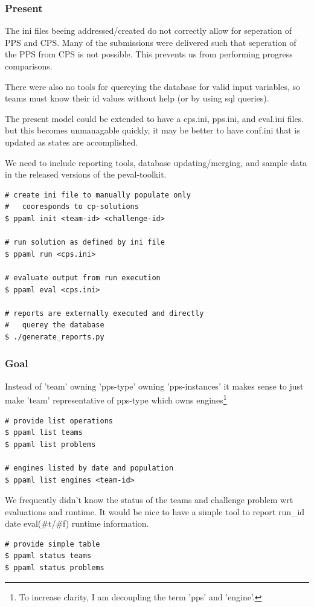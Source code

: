 \documentclass[11pt]{article} %
\def\ptk{peval-toolkit\xspace}
\begin{document}
  \begin{multicols}{2}
  \subsubsection*{Present}
  The ini files beeing addressed/created do not correctly allow for seperation of PPS and CPS. Many of the submissions were delivered such that seperation of the PPS from CPS is not possible. This prevents us from performing progress comparisons. 

  There were also no tools for quereying the database for valid input variables, so teams must know their id values without help (or by using sql queries).

  
  The present model could be extended to have a cps.ini, pps.ini, and eval.ini files. but this becomes unmanagable quickly, it may be better to have conf.ini that is updated as states are accomplished.  

  We need to include reporting tools, database updating/merging, and sample data in the released versions of the \ptk.
  
  \begin{lstlisting}
# create ini file to manually populate only
#   cooresponds to cp-solutions
$ ppaml init <team-id> <challenge-id> 

# run solution as defined by ini file
$ ppaml run <cps.ini>

# evaluate output from run execution
$ ppaml eval <cps.ini>

# reports are externally executed and directly 
#   querey the database
$ ./generate_reports.py 
  \end{lstlisting}
  
  \vfill\columnbreak
  \subsubsection*{Goal}
  Instead of 'team' owning 'pps-type' owning 'pps-instances' it makes sense to just make 'team' representative of pps-type which owns engines\footnote{To increase clarity, I am decoupling the term 'pps' and 'engine'.}
  \begin{lstlisting}
# provide list operations
$ ppaml list teams
$ ppaml list problems

# engines listed by date and population
$ ppaml list engines <team-id> 
  \end{lstlisting}
  We frequently didn't know the status of the teams and challenge problem wrt evaluations and runtime. It would be nice to have a simple  tool to report run\_id date eval(\#t/\#f) runtime information.
  \begin{lstlisting}
# provide simple table
$ ppaml status teams
$ ppaml status problems
  \end{lstlisting}


\end{multicols}
\end{document}
